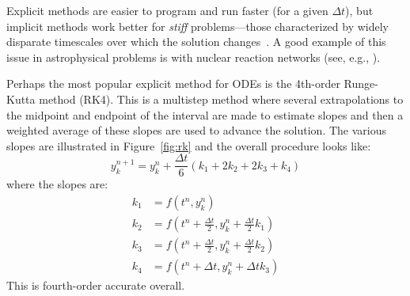 Explicit methods are easier to program and run faster (for a given $
\Delta t$), but implicit methods work better for {\em stiff}
problems---those characterized by widely disparate timescales over
which the solution changes~\cite{byrnehindmarsh}.  A good example
of this issue in astrophysical problems is with nuclear reaction
networks (see, e.g., \cite{timmes_networks}).

Perhaps the most popular explicit method for ODEs is the 4th-order
Runge-Kutta method (RK4).  This is a multistep method where several
extrapolations to the midpoint and endpoint of the interval are
made to estimate slopes and then a weighted average of these slopes
are used to advance the solution.  The various slopes
are illustrated in Figure~\ref{fig:rk} and the overall procedure looks like:
\begin{equation}
y_k^{n+1} = y_k^n + \frac{\Delta t}{6} (k_1 + 2 k_2 + 2 k_3 + k_4)
\end{equation}
where the slopes are:
\begin{align}
k_1 &= f(t^n, y_k^n) \\
k_2 &= f(t^n + \tfrac{\Delta t}{2}, y_k^n + \tfrac{\Delta t}{2} k_1) \\
k_3 &= f(t^n + \tfrac{\Delta t}{2}, y_k^n + \tfrac{\Delta t}{2} k_2) \\
k_4 &= f(t^n + \Delta t, y_k^n + \Delta t k_3)
\end{align}
This is fourth-order accurate overall.

